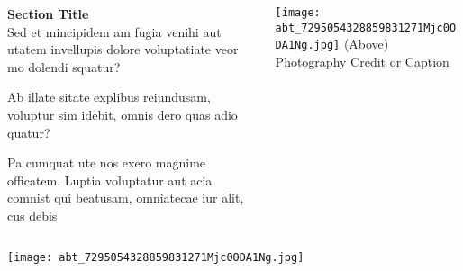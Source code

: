 \documentclass[
	aspectratio=169, %
	t, %
	onlytextwidth, %
	10pt, %
]{beamer}
\begin{document}

\begin{frame}
	\begin{columns}[T] %
		\begin{column}{0.48\linewidth} %
			\textbf{Section Title}\\
			Sed et mincipidem am fugia venihi aut utatem invellupis dolore voluptatiate veor mo dolendi squatur?

			Ab illate sitate explibus reiundusam, voluptur sim idebit, omnis dero quas adio quatur?

			Pa cumquat ute nos exero magnime officatem. Luptia voluptatur aut acia comnist qui beatusam, omniatecae iur alit, cus debis
		\end{column}
		\begin{column}{0.48\linewidth} %
			\texttt{[image: abt\_7295054328859831271Mjc0ODA1Ng.jpg]} %
			{\tiny\textcolor{ICLBlue}{(Above) Photography Credit or Caption}}
		\end{column}
	\end{columns}
\end{frame}


\begin{frame}
	\texttt{[image: abt\_7295054328859831271Mjc0ODA1Ng.jpg]} %
\end{frame}


\begingroup
	
	\begin{frame}[plain] %
	\end{frame}
\endgroup

\end{document}

